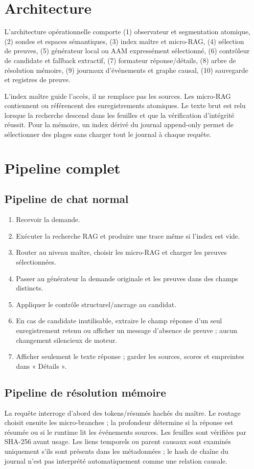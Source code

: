 \documentclass[11pt,a4paper]{article}
\begin{document}
\section{Architecture}
L'architecture opérationnelle comporte (1) observateur et segmentation atomique, (2) sondes et espaces sémantiques, (3) index maître et micro-RAG, (4) sélection de preuves, (5) générateur local ou AAM expressément sélectionné, (6) contrôleur de candidate et fallback extractif, (7) formateur réponse/détails, (8) arbre de résolution mémoire, (9) journaux d'événements et graphe causal, (10) sauvegarde et registres de preuve.

L'index maître guide l'accès, il ne remplace pas les sources. Les micro-RAG contiennent ou référencent des enregistrements atomiques. Le texte brut est relu lorsque la recherche descend dans les feuilles et que la vérification d'intégrité réussit. Pour la mémoire, un index dérivé du journal append-only permet de sélectionner des plages sans charger tout le journal à chaque requête.

\section{Pipeline complet}
\subsection{Pipeline de chat normal}
\begin{enumerate}
\item Recevoir la demande.
\item Exécuter la recherche RAG et produire une trace même si l'index est vide.
\item Router au niveau maître, choisir les micro-RAG et charger les preuves sélectionnées.
\item Passer au générateur la demande originale et les preuves dans des champs distincts.
\item Appliquer le contrôle structurel/ancrage au candidat.
\item En cas de candidate inutilisable, extraire le champ réponse d'un seul enregistrement retenu ou afficher un message d'absence de preuve ; aucun changement silencieux de moteur.
\item Afficher seulement le texte réponse ; garder les sources, scores et empreintes dans « Détails ».
\end{enumerate}

\subsection{Pipeline de résolution mémoire}
La requête interroge d'abord des tokens/résumés hachés du maître. Le routage choisit ensuite les micro-branches ; la profondeur détermine si la réponse est résumée ou si le runtime lit les événements sources. Les feuilles sont vérifiées par SHA-256 avant usage. Les liens temporels ou parent causaux sont examinés uniquement s'ils sont présents dans les métadonnées ; le hash de chaîne du journal n'est pas interprété automatiquement comme une relation causale.
\end{document}
